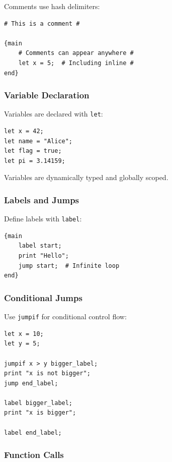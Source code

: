 \documentclass[11pt,a4paper]{article}
\begin{document}
Comments use hash delimiters:

\begin{lstlisting}[style=arcturuscode]
# This is a comment #

{main
    # Comments can appear anywhere #
    let x = 5;  # Including inline #
end}
\end{lstlisting}

\subsubsection{Variable Declaration}

Variables are declared with \texttt{let}:

\begin{lstlisting}[style=arcturuscode]
let x = 42;
let name = "Alice";
let flag = true;
let pi = 3.14159;
\end{lstlisting}

Variables are dynamically typed and globally scoped.

\subsubsection{Labels and Jumps}

Define labels with \texttt{label}:

\begin{lstlisting}[style=arcturuscode]
{main
    label start;
    print "Hello";
    jump start;  # Infinite loop
end}
\end{lstlisting}

\subsubsection{Conditional Jumps}

Use \texttt{jumpif} for conditional control flow:

\begin{lstlisting}[style=arcturuscode]
let x = 10;
let y = 5;

jumpif x > y bigger_label;
print "x is not bigger";
jump end_label;

label bigger_label;
print "x is bigger";

label end_label;
\end{lstlisting}

\subsubsection{Function Calls}
\end{document}
